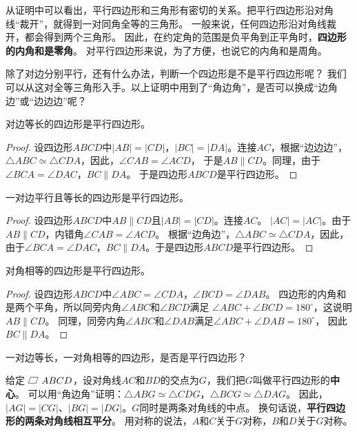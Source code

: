 \documentclass[12pt,UTF8]{ctexbook}
\begin{document}
从证明中可以看出，平行四边形和三角形有密切的关系。把平行四边形沿对角线“裁开”，就得到一对同角全等的三角形。
一般来说，任何四边形沿对角线裁开，都会得到两个三角形。
因此，在约定角的范围是负平角到正平角时，\textbf{四边形的内角和是零角}。
对平行四边形来说，为了方便，也说它的内角和是周角。

除了对边分别平行，还有什么办法，判断一个四边形是不是平行四边形呢？
我们可以从这对全等三角形入手。以上证明中用到了“角边角”，是否可以换成“边角边”或“边边边”呢？

\begin{tm}\label{tm:0-0-1}
    对边等长的四边形是平行四边形。
\end{tm}
\begin{proof}
    设四边形$ABCD$中$|AB| = |CD|$，$|BC| = |DA|$。连接$AC$，根据“边边边”，
    $\triangle ABC \simeq \triangle CDA$，因此，$\angle CAB = \angle ACD$，
    于是$AB \parallel CD$。同理，由于$\angle BCA = \angle DAC$，$BC \parallel DA$。
    于是四边形$ABCD$是平行四边形。
\end{proof}

\begin{tm}\label{tm:0-0-2}
    一对边平行且等长的四边形是平行四边形。
\end{tm}
\begin{proof}
    设四边形$ABCD$中$AB \parallel CD$且$|AB| = |CD|$。连接$AC$。
    $|AC| = |AC|$。由于$AB \parallel CD$，内错角$\angle CAB = \angle ACD$。
    根据“边角边”，$\triangle ABC \simeq \triangle CDA$，因此，
    由于$\angle BCA = \angle DAC$，$BC \parallel DA$。于是四边形$ABCD$是平行四边形。
\end{proof}

\begin{tm}\label{tm:0-0-3}
    对角相等的四边形是平行四边形。
\end{tm}
\begin{proof}
    设四边形$ABCD$中$\angle ABC = \angle CDA$，$\angle BCD = \angle DAB$。
    四边形的内角和是两个平角，所以同旁内角$\angle ABC$和$\angle BCD$满足
    $\angle ABC + \angle BCD = 180^\circ$，这说明$AB \parallel CD$。
    同理，同旁内角$\angle ABC$和$\angle DAB$满足$\angle ABC + \angle DAB = 180^\circ$，
    因此$BC \parallel DA$。
\end{proof}

\begin{sk}\label{sk:0-0-0}
    一对边等长，一对角相等的四边形，是否是平行四边形？
\end{sk}

给定$\parasbx ABCD$，设对角线$AC$和$BD$的交点为$G$，我们把$G$叫做平行四边形的\textbf{中心}。
可以用“角边角”证明：$\triangle ABG \simeq \triangle CDG$，$\triangle BCG \simeq \triangle DAG$。
因此，$|AG| = |CG|$、$|BG| = |DG|$。$G$同时是两条对角线的中点。
换句话说，\textbf{平行四边形的两条对角线相互平分}。
用对称的说法，$A$和$C$关于$G$对称，$B$和$D$关于$G$对称。
\end{document}
